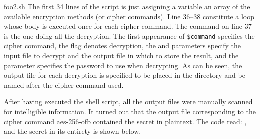 
                {foo2.sh}
The first 34 lines of the script is just assigning a variable an array of the available encryption methods (or cipher commands). Line 36--38 constitute a loop whose body is executed once for each cipher command. The command on line 37 is the one doing all the decryption. The first appearance of \verb|$command| specifies the cipher command, the  flag denotes decryption, the  and  parameters specify the input file to decrypt and the output file in which to store the result, and the  parameter specifies the password to use when decrypting. As can be seen, the output file for each decryption is specified to be placed in the directory  and be named after the cipher command used.

After having executed the shell script, all the output files were manually scanned for intelligible information. It turned out that the output file corresponding to the cipher command aes-256-ofb contained the secret in plaintext. The code read: , and the secret in its entirety is shown below.






